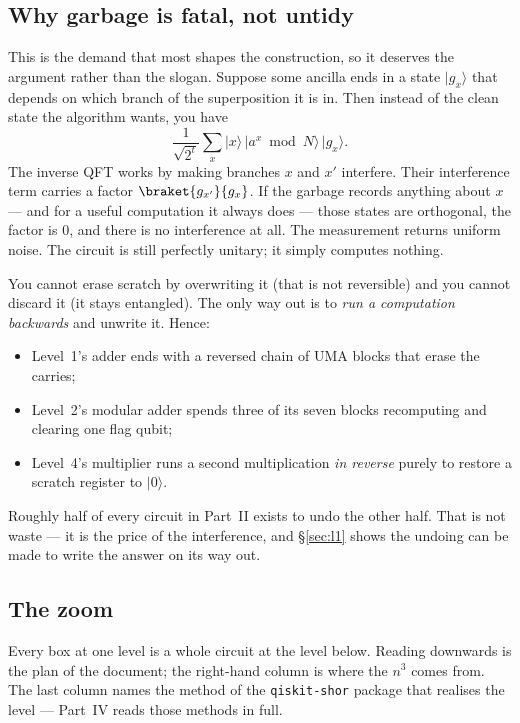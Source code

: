 \documentclass[11pt]{article}
\renewcommand{\ket}[1]{\lvert #1 \rangle}
\newcommand{\UMA}{\mathrm{UMA}}
\newcommand{\code}[1]{\texttt{#1}}
\theoremstyle{plain}
\theoremstyle{remark}
\begin{document}
\subsection{Why garbage is fatal, not untidy}\label{sec:garbage}

This is the demand that most shapes the construction, so it deserves the argument rather than the
slogan. Suppose some ancilla ends in a state $\ket{g_x}$ that depends on which branch of the
superposition it is in. Then instead of the clean state the algorithm wants, you have
\[
\frac1{\sqrt{2^t}}\sum_x\ket x\,\ket{a^x\bmod N}\,\ket{g_x}.
\]
The inverse QFT works by making branches $x$ and $x'$ interfere. Their interference term carries a
factor $\braket{g_{x'}}{g_x}$. If the garbage records anything about $x$ --- and for a useful
computation it always does --- those states are orthogonal, the factor is $0$, and there is no
interference at all. The measurement returns uniform noise. The circuit is still perfectly unitary;
it simply computes nothing.

\begin{warnbox}[title={The consequence for every block below}]
You cannot erase scratch by overwriting it (that is not reversible) and you cannot discard it (it
stays entangled). The only way out is to \emph{run a computation backwards} and unwrite it. Hence:
\begin{itemize}\setlength\itemsep{1pt}
\item Level~1's adder ends with a reversed chain of $\UMA$ blocks that erase the carries;
\item Level~2's modular adder spends three of its seven blocks recomputing and clearing one flag
qubit;
\item Level~4's multiplier runs a second multiplication \emph{in reverse} purely to restore a
scratch register to $\ket0$.
\end{itemize}
Roughly half of every circuit in Part~II exists to undo the other half. That is not waste --- it is
the price of the interference, and \S\ref{sec:l1} shows the undoing can be made to write the answer
on its way out.
\end{warnbox}

\subsection{The zoom}\label{sec:zoom}

Every box at one level is a whole circuit at the level below. Reading downwards is the plan of the
document; the right-hand column is where the $n^3$ comes from. The last column names the method of
the \code{qiskit-shor} package \cite{repo} that realises the level --- Part~IV reads those methods
in full.
\end{document}
